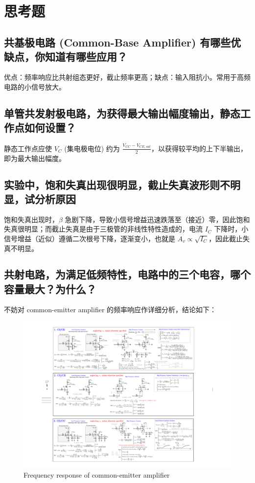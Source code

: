 \documentclass[UTF8]{article}
\begin{document}
\section{思考题}

\subsection{共基极电路 (Common-Base Amplifier) 有哪些优缺点，你知道有哪些应用？}

优点：频率响应比共射组态更好，截止频率更高；缺点：输入阻抗小。常用于高频电路的小信号放大。

\subsection{单管共发射极电路，为获得最大输出幅度输出，静态工作点如何设置？}

静态工作点应使 $V_{C}$ (集电极电位) 约为 $\frac{V_{CC} - V_{CE,sat}}{2}$，以获得较平均的上下半输出，即为最大输出幅度。

\subsection{实验中，饱和失真出现很明显，截止失真波形则不明显，试分析原因}

饱和失真出现时，$\beta$ 急剧下降，导致小信号增益迅速跌落至（接近）零，因此饱和失真很明显；而截止失真是由于三极管的非线性特性造成的，电流 $I_C$ 下降时，小信号增益（近似）遵循二次根号下降，逐渐变小，也就是 $A_v \propto \sqrt{I_C}$，因此截止失真不明显。

\subsection{共射电路，为满足低频特性，电路中的三个电容，哪个容量最大？为什么？}

不妨对 common-emitter amplifier 的频率响应作详细分析，结论如下：

\begin{figure}[H]\centering
    \includegraphics[width=\columnwidth]{LCE-02-三极管/assets/frequency analysis of CE.pdf}
    \caption{Frequency response of common-emitter amplifier}
\end{figure}
\end{document}
